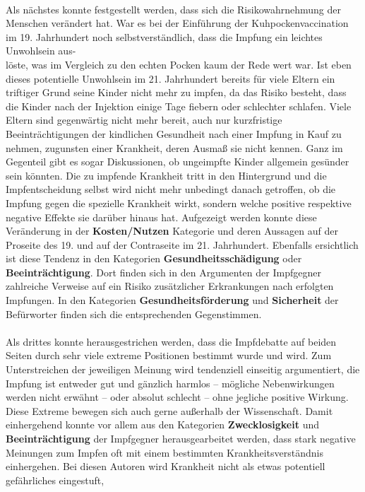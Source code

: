 \documentclass[
    a4paper,
    12pt,
    hyphens,
    chapterprefix=true,
    headheight=33pt,
    footheight=29pt,
    headings=optiontohead,
]{scrartcl}
\begin{document}
{\\
Als nächstes konnte festgestellt werden, dass sich die Risikowahrnehmung der
Menschen verändert hat. War es bei der Einführung der Kuhpockenvaccination im 19. Jahrhundert noch selbstverständlich, dass die Impfung ein leichtes Unwohlsein aus-\\löste, was im Vergleich zu den echten Pocken kaum der Rede wert war. Ist eben dieses potentielle Unwohlsein im 21. Jahrhundert bereits für viele Eltern ein triftiger Grund seine Kinder nicht mehr zu impfen, da das Risiko besteht, dass die Kinder nach der Injektion einige Tage fiebern oder schlechter schlafen. Viele Eltern sind gegenwärtig nicht mehr bereit, auch nur kurzfristige Beeinträchtigungen der
kindlichen Gesundheit nach einer Impfung in Kauf zu nehmen, zugunsten einer
Krankheit, deren Ausmaß sie nicht kennen. Ganz im Gegenteil gibt es sogar
Diskussionen, ob ungeimpfte Kinder allgemein gesünder sein könnten. Die zu impfende Krankheit tritt in den Hintergrund und die Impfentscheidung selbst wird nicht mehr unbedingt danach getroffen, ob die Impfung gegen die spezielle Krankheit wirkt, sondern welche positive respektive negative Effekte sie darüber hinaus hat. Aufgezeigt werden konnte diese Veränderung in der \textbf{Kosten/Nutzen}
Kategorie und deren Aussagen auf der Proseite des 19. und auf der Contraseite
im 21. Jahrhundert. Ebenfalls ersichtlich ist diese Tendenz in den Kategorien \textbf{Gesundheitsschädigung} oder \textbf{Beeinträchtigung}. Dort finden sich in den Argumenten der Impfgegner zahlreiche Verweise auf ein Risiko zusätzlicher Erkrankungen nach erfolgten Impfungen. In den Kategorien \textbf{Gesundheitsförderung} und \textbf{Sicherheit} der Befürworter finden sich die entsprechenden Gegenstimmen. \\
\\
Als drittes konnte herausgestrichen werden, dass die Impfdebatte auf beiden
Seiten durch sehr viele extreme Positionen bestimmt wurde und wird. Zum
Unterstreichen der jeweiligen Meinung wird tendenziell einseitig
argumentiert, die Impfung ist entweder gut und gänzlich harmlos -- mögliche
Nebenwirkungen werden nicht erwähnt -- oder absolut schlecht -- ohne jegliche
positive Wirkung. Diese Extreme bewegen sich auch gerne außerhalb der
Wissenschaft. Damit einhergehend konnte vor allem aus den Kategorien \textbf{Zwecklosigkeit}
 und \textbf{Beeinträchtigung} der Impfgegner herausgearbeitet werden, dass stark negative Meinungen zum
Impfen oft mit einem bestimmten Krankheitsverständnis einhergehen. Bei diesen
Autoren wird Krankheit nicht als etwas potentiell gefährliches eingestuft,
}
\end{document}
